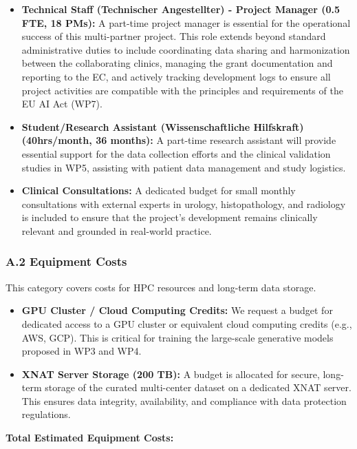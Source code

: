 \begin{itemize}
    \item \textbf{Technical Staff (Technischer Angestellter) - Project Manager (0.5 FTE, 18 PMs):} A part-time project manager is essential for the operational success of this multi-partner project. This role extends beyond standard administrative duties to include coordinating data sharing and harmonization between the collaborating clinics, managing the grant documentation and reporting to the EC, and actively tracking development logs to ensure all project activities are compatible with the principles and requirements of the EU AI Act (WP7).
    \item \textbf{Student/Research Assistant (Wissenschaftliche Hilfskraft) (40hrs/month, 36 months):} A part-time research assistant will provide essential support for the data collection efforts and the clinical validation studies in WP5, assisting with patient data management and study logistics.
    \item \textbf{Clinical Consultations:} A dedicated budget for small monthly consultations with external experts in urology, histopathology, and radiology is included to ensure that the project's development remains clinically relevant and grounded in real-world practice.
\end{itemize}

\subsubsection*{A.2 Equipment Costs}
This category covers costs for HPC resources and long-term data storage.
\begin{itemize}
    \item \textbf{GPU Cluster / Cloud Computing Credits:} We request a budget for dedicated access to a GPU cluster or equivalent cloud computing credits (e.g., AWS, GCP). This is critical for training the large-scale generative models proposed in WP3 and WP4.
    \item \textbf{XNAT Server Storage (200 TB):} A budget is allocated for secure, long-term storage of the curated multi-center dataset on a dedicated XNAT server. This ensures data integrity, availability, and compliance with data protection regulations.
\end{itemize}

\textbf{Total Estimated Equipment Costs: }


